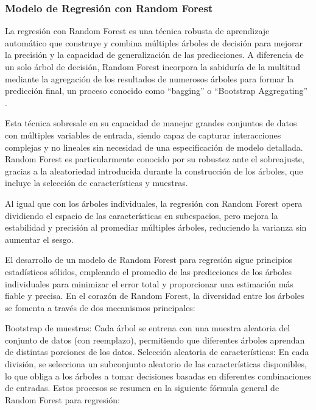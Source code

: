 \documentclass[
  11pt,
  bookmarksnumbered]{article}
\begin{document}
\hypertarget{modelo-de-regresiuxf3n-con-random-forest}{%
\subsubsection{Modelo de Regresión con Random Forest}\label{modelo-de-regresiuxf3n-con-random-forest}}

La regresión con Random Forest es una técnica robusta de aprendizaje automático que construye y combina múltiples árboles de decisión para mejorar la precisión y la capacidad de generalización de las predicciones.
A diferencia de un solo árbol de decisión, Random Forest incorpora la sabiduría de la multitud mediante la agregación de los resultados de numerosos árboles para formar la predicción final, un proceso conocido como ``bagging'' o ``Bootstrap Aggregating'' \textcite{breiman2001random} .

Esta técnica sobresale en su capacidad de manejar grandes conjuntos de datos con múltiples variables de entrada, siendo capaz de capturar interacciones complejas y no lineales sin necesidad de una especificación de modelo detallada.
Random Forest es particularmente conocido por su robustez ante el sobreajuste, gracias a la aleatoriedad introducida durante la construcción de los árboles, que incluye la selección de características y muestras.

Al igual que con los árboles individuales, la regresión con Random Forest opera dividiendo el espacio de las características en subespacios, pero mejora la estabilidad y precisión al promediar múltiples árboles, reduciendo la varianza sin aumentar el sesgo.

El desarrollo de un modelo de Random Forest para regresión sigue principios estadísticos sólidos, empleando el promedio de las predicciones de los árboles individuales para minimizar el error total y proporcionar una estimación más fiable y precisa.
En el corazón de Random Forest, la diversidad entre los árboles se fomenta a través de dos mecanismos principales:

Bootstrap de muestras: Cada árbol se entrena con una muestra aleatoria del conjunto de datos (con reemplazo), permitiendo que diferentes árboles aprendan de distintas porciones de los datos.
Selección aleatoria de características: En cada división, se selecciona un subconjunto aleatorio de las características disponibles, lo que obliga a los árboles a tomar decisiones basadas en diferentes combinaciones de entradas.
Estos procesos se resumen en la siguiente fórmula general de Random Forest para regresión:
\end{document}

